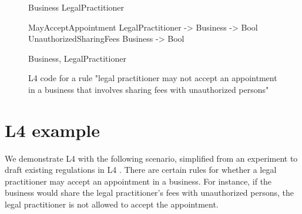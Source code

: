 \documentclass[11pt]{article}
\begin{document}





\begin{figure}[t]
\begin{Shaded}
\begin{Highlighting}[]
  Business
  LegalPractitioner

  MayAcceptAppointment 
    \KeywordTok{:} LegalPractitioner -> 
      Business -> Bool
  UnauthorizedSharingFees
    \KeywordTok{:} Business -> Bool
    
 
  \KeywordTok{:} Business,
      \KeywordTok{:} LegalPractitioner
 
 
\end{Highlighting}
\end{Shaded}
\caption{L4 code for a rule "legal practitioner may not accept an appointment in a business that involves sharing fees with unauthorized persons"}
\label{fig:minimalL4code}
\end{figure}


\section{L4 example}
\label{sec:example}
We demonstrate L4 with the following scenario, simplified from an experiment to draft existing regulations in L4 \cite{morris2021rule34}.
There are certain rules for whether a legal practitioner may accept an appointment in a business. 
For instance, if the business would share the legal practitioner's fees with unauthorized persons, the legal practitioner is not allowed to accept the appointment.
\end{document}
